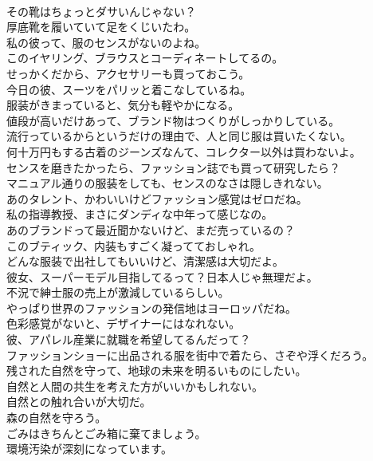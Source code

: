\documentclass[8pt]{extreport}
\begin{document}
\begin{CJK}{UTF8}{min}
\\	その靴はちょっとダサいんじゃない？	
\\	厚底靴を履いていて足をくじいたわ。	
\\	私の彼って、服のセンスがないのよね。	
\\	このイヤリング、ブラウスとコーディネートしてるの。	
\\	せっかくだから、アクセサリーも買っておこう。	
\\	今日の彼、スーツをパリッと着こなしているね。	
\\	服装がきまっていると、気分も軽やかになる。	
\\	値段が高いだけあって、ブランド物はつくりがしっかりしている。	
\\	流行っているからというだけの理由で、人と同じ服は買いたくない。	
\\	何十万円もする古着のジーンズなんて、コレクター以外は買わないよ。	
\\	センスを磨きたかったら、ファッション誌でも買って研究したら？	
\\	マニュアル通りの服装をしても、センスのなさは隠しきれない。	
\\	あのタレント、かわいいけどファッション感覚はゼロだね。	
\\	私の指導教授、まさにダンディな中年って感じなの。	
\\	あのブランドって最近聞かないけど、まだ売っているの？	
\\	このブティック、内装もすごく凝ってておしゃれ。	
\\	どんな服装で出社してもいいけど、清潔感は大切だよ。	
\\	彼女、スーパーモデル目指してるって？日本人じゃ無理だよ。	
\\	不況で紳士服の売上が激減しているらしい。	
\\	やっぱり世界のファッションの発信地はヨーロッパだね。	
\\	色彩感覚がないと、デザイナーにはなれない。	
\\	彼、アパレル産業に就職を希望してるんだって？	
\\	ファッションショーに出品される服を街中で着たら、さぞや浮くだろう。	
\\	残された自然を守って、地球の未来を明るいものにしたい。	
\\	自然と人間の共生を考えた方がいいかもしれない。	
\\	自然との触れ合いが大切だ。	
\\	森の自然を守ろう。	
\\	ごみはきちんとごみ箱に棄てましょう。	
\\	環境汚染が深刻になっています。	

\end{CJK}
\end{document}
